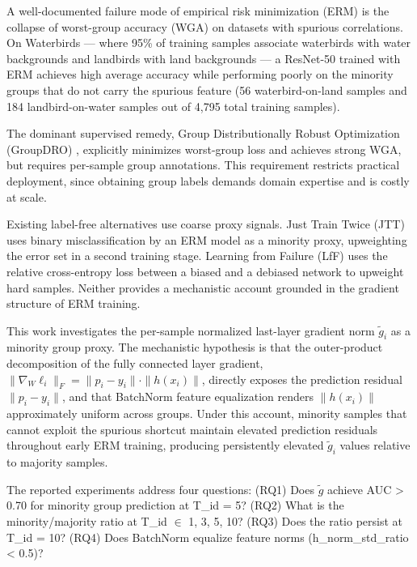
A well-documented failure mode of empirical risk minimization (ERM) is the collapse of worst-group accuracy (WGA) on datasets with spurious correlations. On Waterbirds \citep{Sagawa2019Distributionally} --- where 95\% of training samples associate waterbirds with water backgrounds and landbirds with land backgrounds --- a ResNet-50 trained with ERM achieves high average accuracy while performing poorly on the minority groups that do not carry the spurious feature (56 waterbird-on-land samples and 184 landbird-on-water samples out of 4,795 total training samples).

The dominant supervised remedy, Group Distributionally Robust Optimization (GroupDRO) \citep{Sagawa2019Distributionally}, explicitly minimizes worst-group loss and achieves strong WGA, but requires per-sample group annotations. This requirement restricts practical deployment, since obtaining group labels demands domain expertise and is costly at scale.

Existing label-free alternatives use coarse proxy signals. Just Train Twice (JTT) \citep{Liu2021Just} uses binary misclassification by an ERM model as a minority proxy, upweighting the error set in a second training stage. Learning from Failure (LfF) \citep{Nam2020Learning} uses the relative cross-entropy loss between a biased and a debiased network to upweight hard samples. Neither provides a mechanistic account grounded in the gradient structure of ERM training.

This work investigates the per-sample normalized last-layer gradient norm $\tilde{g}_i$ as a minority group proxy. The mechanistic hypothesis is that the outer-product decomposition of the fully connected layer gradient, $\|\nabla _W \ell _{i}\|_F = \|p_i - y_{i}\| \cdot \|h(x_{i})\|$, directly exposes the prediction residual $\|p_i - y_{i}\|$, and that BatchNorm feature equalization renders $\|h(x_{i})\|$ approximately uniform across groups. Under this account, minority samples that cannot exploit the spurious shortcut maintain elevated prediction residuals throughout early ERM training, producing persistently elevated $\tilde{g}_i$ values relative to majority samples.

The reported experiments address four questions: (RQ1) Does $\tilde{g}$ achieve AUC > 0.70 for minority group prediction at T\_id = 5? (RQ2) What is the minority/majority ratio at T\_id $\in$ {1, 3, 5, 10}? (RQ3) Does the ratio persist at T\_id = 10? (RQ4) Does BatchNorm equalize feature norms (h\_norm\_std\_ratio < 0.5)?

